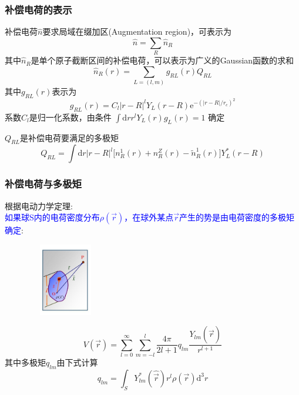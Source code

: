 \frame
{
	\frametitle{补偿电荷的表示}
	补偿电荷$\hat n$要求局域在缀加区(\textrm{Augmentation region})，可表示为
	$$\hat n=\sum_R\hat n_R$$
	其中$\hat n_R$是单个原子截断区间的补偿电荷，可以表示为广义的\textrm{Gaussian}函数的求和
	$$\hat n_R(r)=\sum_{L=(l,m)}g_{RL}(r)Q_{RL}$$
	其中$g_{RL}(r)$表示为
	$$g_{RL}(r)=C_l|r-R|^lY_L(r-R)\mathrm{e}^{-(|r-R|/r_c)^2}$$
	系数$C_l$是归一化系数，由条件
	$\int\mathrm{d}rr^lY_L(r)g_L(r)=1$
	确定

	$Q_{RL}$是补偿电荷要满足的多极矩
	$$Q_{RL}=\int\mathrm{d}r|r-R|^l\big[n_R^1(r)+n_R^Z(r)-\tilde n_R^1(r)\big]Y_L^{\ast}(r-R)$$
}

\frame
{
\frametitle{补偿电荷与多极矩}
根据电动力学定理:\\\textcolor{blue}{如果球\textrm{S}内的电荷密度分布$\rho(\vec r)$，在球外某点$\vec r$产生的势是由电荷密度的多极矩确定}:
\begin{figure}[h!]
\vspace*{-15pt}
\centering
\includegraphics[height=1.25in,width=1.32in,viewport=1 22 507 575,clip]{Figures/potential_multipole.jpg}
\label{Potential-multipole}
\end{figure}
\begin{displaymath}
	V(\vec r)=\sum_{l=0}^{\infty}\sum_{m=-l}^{l}\dfrac{4\pi}{2l+1}q_{lm}\dfrac{Y_{lm}(\hat{\vec r})}{r^{l+1}}
\end{displaymath}
其中多极矩$q_{lm}$由下式计算
\begin{displaymath}
	q_{lm}=\int_SY_{lm}^{\ast}(\hat{\vec r})r^l\rho(\vec r)\mathrm{d}^3r
\end{displaymath}
}

